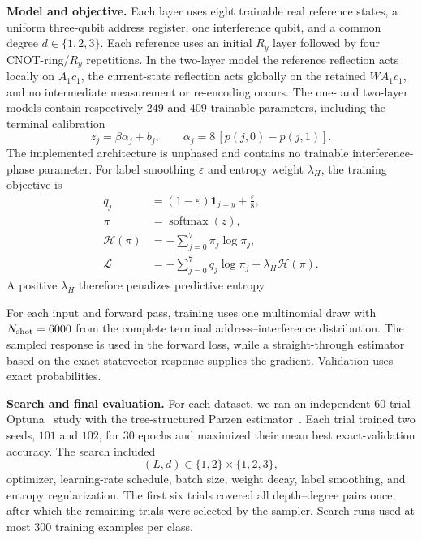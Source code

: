 \documentclass[pdflatex,sn-mathphys,NameDate,iicol]{sn-jnl}
\begin{document}
\noindent\textbf{Model and objective.}\quad
Each layer uses eight trainable real reference states, a uniform three-qubit
address register, one interference qubit, and a common degree
$d\in\{1,2,3\}$. Each reference uses an initial $R_y$ layer followed by four
CNOT-ring/$R_y$ repetitions. In the two-layer model the reference reflection
acts locally on $A_1c_1$, the current-state reflection acts globally on the
retained $WA_1c_1$, and no intermediate measurement or re-encoding occurs.
The one- and two-layer models contain respectively $249$ and $409$ trainable
parameters, including the terminal calibration
\begin{equation}
 z_j=\beta\alpha_j+b_j,
 \qquad
 \alpha_j=8\,[p(j,0)-p(j,1)].
 \label{eq:experimental-calibration}
\end{equation}
The implemented architecture is unphased and contains no trainable
interference-phase parameter. For label smoothing $\varepsilon$ and entropy weight $\lambda_H$,
the training objective is
\begin{align}
 q_j&=(1-\varepsilon)\mathbf1_{j=y}+\frac{\varepsilon}{8},
 \\
 \pi&=\operatorname{softmax}(z),
 \\
 \mathcal H(\pi)&=-\sum_{j=0}^{7}\pi_j\log\pi_j,
 \\
 \mathcal L
 &=-\sum_{j=0}^{7}q_j\log\pi_j
   +\lambda_H\mathcal H(\pi).
 \label{eq:experimental-loss}
\end{align}
A positive $\lambda_H$ therefore penalizes predictive entropy.

For each input and forward pass, training uses one multinomial draw with
$N_{\rm shot}=6000$ from the complete terminal address--interference
distribution. The sampled response is used in the forward loss, while a
straight-through estimator based on the exact-statevector response supplies
the gradient. Validation uses exact probabilities.

\noindent\textbf{Search and final evaluation.}\quad
For each dataset, we ran an independent 60-trial
Optuna~\citep{akiba2019optuna} study with the tree-structured Parzen
estimator~\citep{bergstra2011algorithms}. Each trial trained two seeds,
$101$ and $102$, for 30 epochs and maximized their mean best exact-validation
accuracy. The search included
\begin{equation*}
(L,d)\in\{1,2\}\times\{1,2,3\},
\end{equation*}
optimizer, learning-rate schedule, batch size, weight decay, label smoothing,
and entropy regularization. The first six trials covered all depth--degree
pairs once, after which the remaining trials were selected by the sampler.
Search runs used at most 300 training examples per class.
\end{document}
